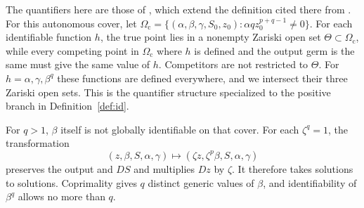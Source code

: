 \documentclass[10pt,a4paper]{article}
\theoremstyle{definition}\newtheorem{definition}[theorem]{Definition}
\begin{document}
The quantifiers here are those of \cite[Notation~2.1 and
Definition~2.2]{OPT}, which extend the definition cited there from
\cite{HOPY}. For this autonomous cover, let
$\Omega_{\mathrm c}=\{(\alpha,\beta,\gamma,S_0,z_0):
\alpha qz_0^{p+q-1}\ne0\}$. For each identifiable function $h$,
the true point lies in a nonempty Zariski open set
$\Theta\subset\Omega_{\mathrm c}$, while every competing point in
$\Omega_{\mathrm c}$ where $h$ is defined and the output germ is the same
must give the same value of $h$. Competitors are not restricted to
$\Theta$. For $h=\alpha,\gamma,\beta^q$ these functions are defined
everywhere, and we intersect their three Zariski open sets. This is
the quantifier structure specialized to the positive branch in
Definition~\ref{def:id}.

For $q>1$, $\beta$ itself is not globally identifiable on that cover.
For each $\zeta^q=1$, the transformation
\begin{equation}
(z,\beta,S,\alpha,\gamma)\longmapsto
(\zeta z,\zeta^p\beta,S,\alpha,\gamma)
\label{eq:symmetry}
\end{equation}
preserves the output and $DS$ and multiplies $Dz$ by $\zeta$.
It therefore takes solutions to solutions. Coprimality gives $q$
distinct generic values of $\beta$, and identifiability of $\beta^q$
allows no more than $q$.
\end{document}

